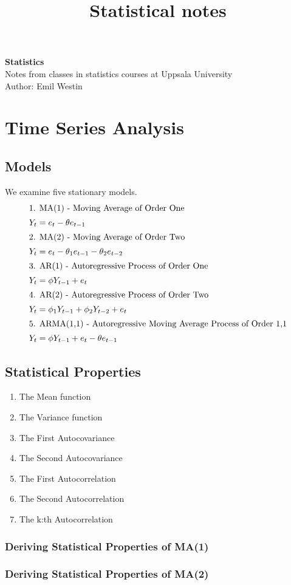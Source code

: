 \documentclass[11pt]{article}
\begin{document}
\title{Statistical notes}

\thispagestyle{empty}

\begin{center}
{\LARGE \bf Statistics}\\
Notes from classes in statistics courses at Uppsala University \\
Author: Emil Westin
\end{center}

\section{Time Series Analysis}
\subsection{Models}

We examine five stationary models.
\begin{align}
\intertext{1. MA(1) - Moving Average of Order One}
Y_t & = e_t - \theta e_{t-1} \label{MA1} \\
\intertext{2. MA(2) - Moving Average of Order Two}
Y_t & = e_t - \theta_1 e_{t-1} -  \theta_2 e_{t-2} \label{MA2} \\
\intertext{3. AR(1) - Autoregressive Process of Order One}
Y_t & = \phi Y_{t-1} + e_t \label{AR1} \\
\intertext{4. AR(2) - Autoregressive Process of Order Two}
Y_t & = \phi_1 Y_{t-1} + \phi_2 Y_{t-2} + e_t \label{AR2} \\
\intertext{5. ARMA(1,1) - Autoregressive Moving Average Process of Order 1,1}
Y_t & = \phi Y_{t-1} + e_t - \theta e_{t-1} \label{ARMA} 
\end{align}

\subsection{Statistical Properties}

\begin{enumerate}
\item The Mean function
\item The Variance function
\item The First Autocovariance  
\item The Second Autocovariance  
\item The First Autocorrelation 
\item The Second Autocorrelation 
\item The k:th Autocorrelation 
\end{enumerate}

\subsubsection{Deriving Statistical Properties of MA(1)}

\subsubsection{Deriving Statistical Properties of MA(2)}
\end{document}
